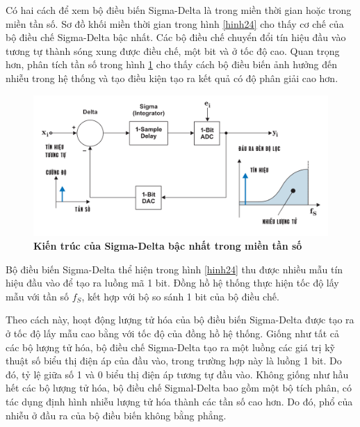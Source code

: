 Có hai cách để xem bộ điều biến Sigma-Delta là trong miền thời gian hoặc trong miền tần số. Sơ đồ khối miền thời gian trong hình \ref{hinh24} cho thấy cơ chế của bộ điều chế Sigma-Delta bậc nhất. Các bộ điều chế chuyển đổi tín hiệu đầu vào tương tự thành sóng xung được điều chế, một bit và ở tốc độ cao. Quan trọng hơn, phân tích tần số trong hình \ref{hinh25} cho thấy cách bộ điều biến ảnh hưởng đến nhiễu trong hệ thống và tạo điều kiện tạo ra kết quả có độ phân giải cao hơn.
\begin{figure}
    \centering
    \includegraphics[width=13cm]{Images/Chuong2/kientruc_1st_pho.png}
    \caption[Kiến trúc của Sigma-Delta bậc nhất trong miền tần số]{\bfseries \fontsize{12pt}{0pt}\selectfont Kiến trúc của Sigma-Delta bậc nhất trong miền tần số}
    \label{hinh25}
\end{figure}

Bộ điều biến Sigma-Delta thể hiện trong hình \ref{hinh24} thu được nhiều mẫu tín hiệu đầu vào để tạo ra luồng mã 1 bit. Đồng hồ hệ thống thực hiện tốc độ lấy mẫu với tần số $f_S$, kết hợp với bộ so sánh 1 bit của bộ điều chế.

Theo cách này, hoạt động lượng tử hóa của bộ điều biến Sigma-Delta được tạo ra ở tốc độ lấy mẫu cao bằng với tốc độ của đồng hồ hệ thống. Giống như tất cả các bộ lượng tử hóa, bộ điều chế Sigma-Delta tạo ra một luồng các giá trị kỹ thuật số biểu thị điện áp 
của đầu vào, trong trường hợp này là luồng 1 bit. Do đó, tỷ lệ giữa số 1 và 0 biểu thị điện áp tương tự đầu vào. Không giống như hầu hết các bộ lượng tử hóa, bộ điều chế Sigmal-Delta bao gồm một bộ tích phân, có tác dụng định hình nhiễu lượng tử hóa thành các tần số cao hơn. Do đó, phổ của nhiễu ở đầu ra của bộ điều biến không bằng phẳng.

